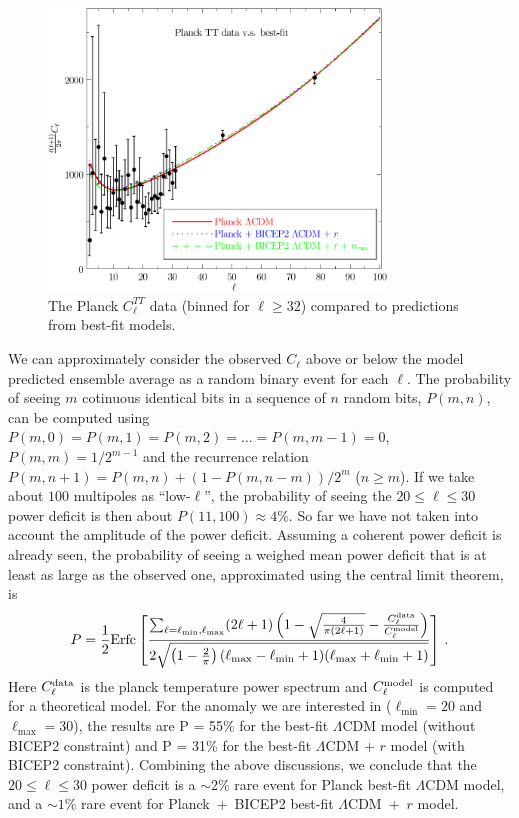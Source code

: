 \documentclass[11pt]{article}
\def \figwidth{0.8\textwidth}
\begin{document}
\begin{figure}
  \includegraphics[width =\figwidth]{dcl.pdf}
  \caption{The Planck $C_\ell^{TT}$ data (binned for $\ell \ge 32$) compared to predictions from best-fit models. \label{fig:dcls}}
\end{figure}


We can approximately consider the observed $C_\ell$ above or below the model predicted ensemble average as a random binary event for each $\ell$. The probability of seeing $m$ cotinuous identical bits in a sequence of $n$ random bits, $P(m, n)$, can be computed using $P(m, 0) = P(m, 1) = P(m, 2) = \ldots = P(m, m-1) = 0$, $P(m, m) = 1/2^{m-1}$ and the recurrence relation $P(m, n+1 ) = P(m, n) + (1-P(m, n-m))/2^m$ ($n\ge m$). If we take about $100$ multipoles as ``low-$\ell$'', the probability of seeing the $20\le \ell \le 30$ power deficit is then about $P(11, 100)\approx 4\%$. So far we have not taken into account the amplitude of the power deficit. Assuming a coherent power deficit is already seen, the probability of seeing a weighed mean power deficit that is at least as large as the observed one, approximated using the central limit theorem, is 
\begin{equation}
  P = \frac{1}{2}{\rm Erfc}\left[\frac{\sum_{\ell = \ell_{\min}, \ell_{\max}} (2\ell+1)\left(  1 - \sqrt{\frac{4}{\pi(2\ell+1)}} -  \frac{C_\ell^{\rm data}}{C_\ell^{\rm model}}\right)}{2\sqrt{\left(1-\frac{2}{\pi}\right)(\ell_{\max}-\ell_{\min}+1)(\ell_{\max}+\ell_{\min}+1)}}\right] \, .
\end{equation}
Here $C_\ell^{\rm data}$ is the planck temperature power spectrum and $C_\ell^{\rm model}$ is computed for a theoretical model. For the anomaly we are interested in ($\ell_{\min} = 20$ and $\ell_{\max}=30$), the results are P = 55\% for the best-fit $\Lambda$CDM model (without BICEP2 constraint) and P = 31\% for the best-fit $\Lambda$CDM + $r$ model (with BICEP2 constraint). Combining the above discussions, we conclude that the $20\le\ell\le 30$ power deficit is a $\sim 2\%$ rare event for Planck best-fit $\Lambda$CDM model, and a $\sim 1\%$ rare event for Planck~+~BICEP2 best-fit $\Lambda$CDM~+~$r$ model. 
\end{document}
